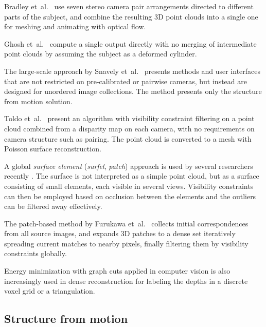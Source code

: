 Bradley et~al.\ \cite{bradley2008markerless,bradley2010high} use seven stereo camera pair arrangements directed to different parts of the subject, and combine the resulting 3D point clouds into a single one for meshing and animating with optical flow.

Ghosh et~al.\ \cite{ghosh2011multiview} compute a single output directly with no merging of intermediate point clouds by assuming the subject as a deformed cylinder.

The large-scale approach by Snavely et~al.\ \cite{snavely2006photo} presents methods and user interfaces that are not restricted on pre-calibrated or pairwise cameras, but instead are designed for unordered image collections.
The method presents only the structure from motion solution.

Toldo et~al.\ \cite{toldo2013accurate,toldo2013towards} present an algorithm with visibility constraint filtering on a point cloud combined from a disparity map on each camera, with no requirements on camera structure such as pairing.
The point cloud is converted to a mesh with Poisson surface reconstruction.

A global \emph{surface element} (\emph{surfel}, \emph{patch}) approach is used by several researchers recently \cite{carceroni2002multi,furukawa2010accurate,vu2012high,chang2011gpu}.
The surface is not interpreted as a simple point cloud, but as a surface consisting of small elements, each visible in several views.
Visibility constraints can then be employed based on occlusion between the elements and the outliers can be filtered away effectively.

The patch-based method by Furukawa et~al.\ \cite{furukawa2012patch,furukawa2010accurate} collects initial correspondences from all source images, and expands 3D patches to a dense set iteratively spreading current matches to nearby pixels, finally filtering them by visibility constraints globally.

Energy minimization with graph cuts applied in computer vision \cite{boykov2004experimental} is also increasingly used in dense reconstruction \cite{chang2011gpu,vu2012high,labatut2009robust,jancosek2011multi} for labeling the depths in a discrete voxel grid or a triangulation.


\subsection{Structure from motion} \label{sec:sfm} %



